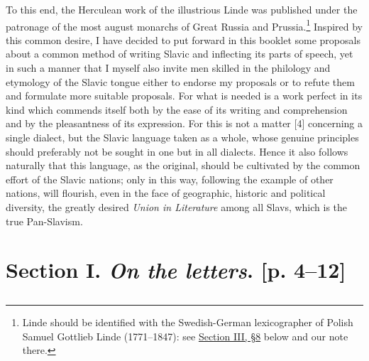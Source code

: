 To this end, the Herculean work of the illustrious Linde was published under the patronage of the most august monarchs of Great Russia and Prussia.\footnote{Linde should be identified with the Swedish-German lexicographer of Polish Samuel Gottlieb Linde (1771--1847): see \hyperref[sec:3-3]{Section III, §8} below and our note there.} Inspired by this common desire, I have decided to put forward in this booklet some proposals about a common method of writing Slavic and inflecting its parts of speech, yet in such a manner that I myself also invite men skilled in the philology and etymology of the Slavic tongue either to endorse my proposals or to refute them and formulate more suitable proposals. For what is needed is a work perfect in its kind which commends itself both by the ease of its writing and comprehension and by the pleasantness of its expression. For this is not a matter [4] concerning a single dialect, but the Slavic language taken as a whole, whose genuine principles should preferably not be sought in one but in all dialects. Hence it also follows naturally that this language, as the original, should be cultivated by the common effort of the Slavic nations; only in this way, following the example of other nations, will flourish, even in the face of geographic, historic and political diversity, the greatly desired \textit{Union in Literature} among all Slavs, which is the true Pan-Slavism.

\section*{Section I. \textit{On the letters}. [p. 4--12]}

\subsection*{\hspace*{\fill}{§. 1.}\hspace*{\fill}}

